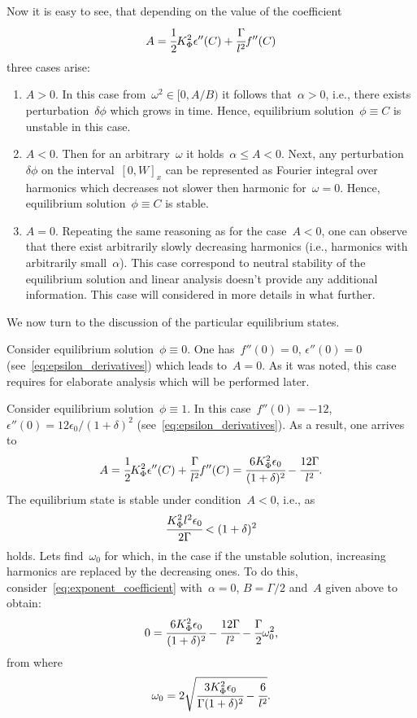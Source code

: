 Now it is easy to see, that depending on the value of the coefficient
$$A = \cfrac{1}{2} K_\Phi^2 \epsilon''(C) + \cfrac{\Gamma}{l^2} f''(C)$$
three cases arise:
%
\begin{enumerate}[label=\arabic*.]
\item $A > 0$. In this case from~$\omega^2 \in [0, A / B)$ it follows
  that~$\alpha > 0$, i.e., there exists perturbation~$\delta \phi$
  which grows in time. Hence, equilibrium solution~$\phi \equiv C$ is
  unstable in this case.
  
\item $A < 0$. Then for an arbitrary~$\omega$ it holds~$\alpha
  \leqslant A < 0$. Next, any perturbation~$\delta \phi$ on the
  interval~$[0, W]_x$ 
  can be represented as Fourier integral over harmonics which decreases
  not slower then harmonic for~$\omega = 0$.
  Hence, equilibrium solution~$\phi \equiv C$ is stable.
  
\item $A = 0$. Repeating the same reasoning as for the case~$A < 0$,
  one can observe that there exist arbitrarily slowly decreasing
  harmonics (i.e., harmonics with arbitrarily small~$\alpha$).
  This case correspond to neutral stability of the equilibrium
  solution and linear analysis doesn't provide any additional
  information.
  This case will considered in more details in what further.
\end{enumerate}

We now turn to the discussion of the particular equilibrium states.

Consider equilibrium solution~$\phi \equiv 0$.
One has~$f''(0) = 0$, $\epsilon''(0) = 0$
(see~\eqref{eq:epsilon_derivatives})
which leads to~$A = 0$.
As it was noted, this case requires for elaborate analysis which will be
performed later.

Consider equilibrium solution~$\phi \equiv 1$.
In this case~$f''(0) = -12$, $\epsilon''(0) = 12 \epsilon_0 / (1 +
\delta)^2$ (see~\eqref{eq:epsilon_derivatives}).
As a result, one arrives to
$$A = \cfrac{1}{2} K_\Phi^2 \epsilon''(C) + \cfrac{\Gamma}{l^2} f''(C) = \cfrac{6 K_\Phi^2 \epsilon_0}{(1 + \delta)^2} - \cfrac{12 \Gamma}{l^2} {\text{.}}$$
The equilibrium state is stable under condition~$A < 0$, i.e., as 
\begin{equation}
  \cfrac{K_\Phi^2 l^2 \epsilon_0}{2 \Gamma} < (1 + \delta)^2 
  \label{cond:equilibrium_1_stable}
\end{equation}
holds.      
Lets find~$\omega_0$ for which, in the case if the unstable solution,
increasing harmonics are replaced by the decreasing ones.
To do this, consider~\eqref{eq:exponent_coefficient} with~$\alpha =
0$, $B = \Gamma/2$ and~$A$ given above to obtain: 
$$0 = \cfrac{6 K_\Phi^2 \epsilon_0}{(1 + \delta)^2} - \cfrac{12 \Gamma}{l^2} - \cfrac{\Gamma}{2} \omega_0^2 {\text{,}}$$
from where
$$\omega_0 = 2 \sqrt{\cfrac{3 K_\Phi^2 \epsilon_0}{\Gamma (1 + \delta)^2} - \cfrac{6}{l^2}} {\text{.}}$$

